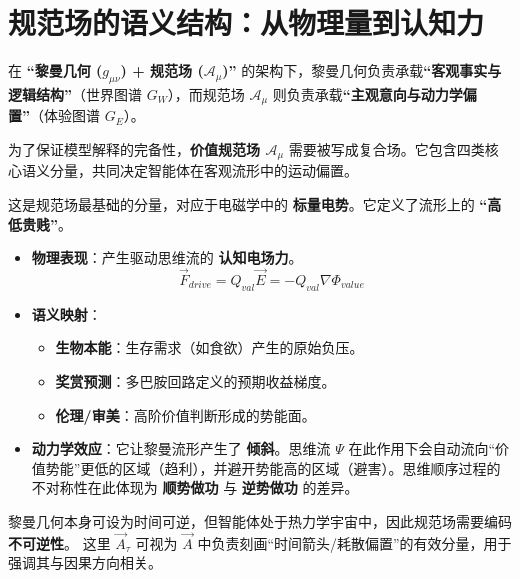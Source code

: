 \section{规范场的语义结构：从物理量到认知力}
\label{sec:semantic_structure_of_gauge}

在 \textbf{“黎曼几何 ($g_{\mu\nu}$) + 规范场 ($\mathcal{A}_\mu$)”} 的架构下，黎曼几何负责承载\textbf{“客观事实与逻辑结构”}（世界图谱 $G_W$），而规范场 $\mathcal{A}_\mu$ 则负责承载\textbf{“主观意向与动力学偏置”}（体验图谱 $G_E$）。

为了保证模型解释的完备性，\textbf{价值规范场 $\mathcal{A}_\mu$} 需要被写成复合场。它包含四类核心语义分量，共同决定智能体在客观流形中的运动偏置。


这是规范场最基础的分量，对应于电磁学中的 \textbf{标量电势}。它定义了流形上的 \textbf{“高低贵贱”}。

\begin{itemize}
    \item \textbf{物理表现}：产生驱动思维流的 \textbf{认知电场力}。
    $$ \vec{F}_{drive} = Q_{val} \vec{E} = -Q_{val} \nabla \Phi_{value} $$
    \item \textbf{语义映射}：
    \begin{itemize}
        \item \textbf{生物本能}：生存需求（如食欲）产生的原始负压。
        \item \textbf{奖赏预测}：多巴胺回路定义的预期收益梯度。
        \item \textbf{伦理/审美}：高阶价值判断形成的势能面。
    \end{itemize}
    \item \textbf{动力学效应}：它让黎曼流形产生了 \textbf{倾斜}。思维流 $\Psi$ 在此作用下会自动流向“价值势能”更低的区域（趋利），并避开势能高的区域（避害）。思维顺序过程的不对称性在此体现为 \textbf{顺势做功} 与 \textbf{逆势做功} 的差异。
\end{itemize}


黎曼几何本身可设为时间可逆，但智能体处于热力学宇宙中，因此规范场需要编码 \textbf{不可逆性}。
这里 $\vec{A}_{\tau}$ 可视为 $\vec{A}$ 中负责刻画“时间箭头/耗散偏置”的有效分量，用于强调其与因果方向相关。

